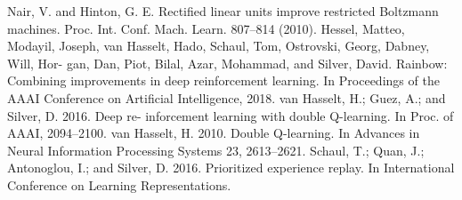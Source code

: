 \documentclass[12pt,a4paper,openright,twoside]{article}
\numberwithin{equation}{section}
\theoremstyle{definition}
\theoremstyle{remark}
\theoremstyle{plain}
\begin{document}
\begin{thebibliography}{50}
	 Nair, V. and Hinton, G. E. Rectified linear units improve restricted Boltzmann machines. Proc. Int. Conf. Mach. Learn. 807–814 (2010).
	 Hessel, Matteo, Modayil, Joseph, van Hasselt, Hado, Schaul, Tom, Ostrovski, Georg, Dabney, Will, Hor- gan, Dan, Piot, Bilal, Azar, Mohammad, and Silver, David. Rainbow: Combining improvements in deep reinforcement learning. In Proceedings of the AAAI Conference on Artificial Intelligence, 2018.
	 van Hasselt, H.; Guez, A.; and Silver, D. 2016. Deep re- inforcement learning with double Q-learning. In Proc. of AAAI, 2094–2100.
	 van Hasselt, H. 2010. Double Q-learning. In Advances in Neural Information Processing Systems 23, 2613–2621.
	 Schaul, T.; Quan, J.; Antonoglou, I.; and Silver, D. 2016. Prioritized experience replay. In International Conference on Learning Representations.





\end{thebibliography}


\end{document}

